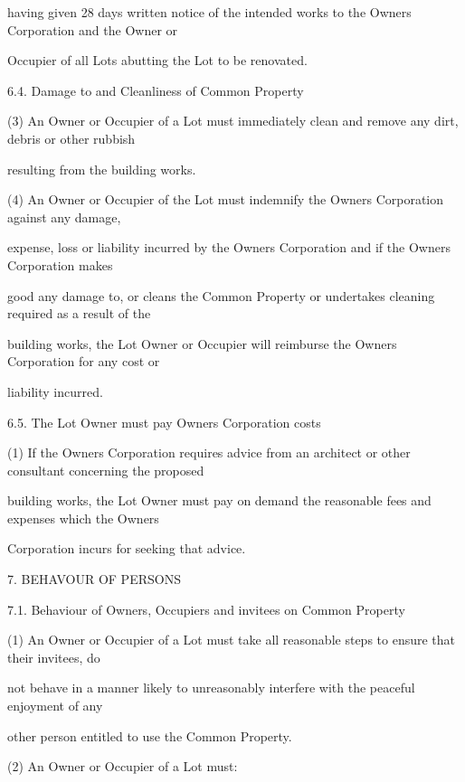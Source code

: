\documentclass{article}
\begin{document}
{\fontsize{10.02}{1}having given 28 days written notice of the intended works to the Owners Corporation and the Owner or }

{\fontsize{10.02}{1}Occupier of all Lots abutting the Lot to be renovated. }

{\fontsize{9.99}{1}6.4. Damage to and Cleanliness of Common Property }

{\fontsize{9.962}{1}(3) An Owner or Occupier of a Lot must immediately clean and remove any dirt, debris or other rubbish }

{\fontsize{10.02}{1}resulting from the building works. }

{\fontsize{9.962}{1}(4) An Owner or Occupier of the Lot must indemnify the Owners Corporation against any damage, }

{\fontsize{10.02}{1}expense, loss or liability incurred by the Owners Corporation and if the Owners Corporation makes }

{\fontsize{10.02}{1}good any damage to, or cleans the Common Property or undertakes cleaning required as a result of the }

{\fontsize{10.02}{1}building works, the Lot Owner or Occupier will reimburse the Owners Corporation for any cost or }

{\fontsize{10.02}{1}liability incurred. }

{\fontsize{9.99}{1}6.5. The Lot Owner must pay Owners Corporation costs }

{\fontsize{9.962}{1}(1) If the Owners Corporation requires advice from an architect or other consultant concerning the proposed }

{\fontsize{10.02}{1}building works, the Lot Owner must pay on demand the reasonable fees and expenses which the Owners }

{\fontsize{10.02}{1}Corporation incurs for seeking that advice. }

{\fontsize{9.99}{1}7. BEHAVOUR OF PERSONS }

{\fontsize{9.99}{1}7.1. Behaviour of Owners, Occupiers and invitees on Common Property }

{\fontsize{9.962}{1}(1) An Owner or Occupier of a Lot must take all reasonable steps to ensure that their invitees, do }

{\fontsize{10.02}{1}not behave in a manner likely to unreasonably interfere with the peaceful enjoyment of any }

{\fontsize{10.02}{1}other person entitled to use the Common Property. }

{\fontsize{9.962}{1}(2) An Owner or Occupier of a Lot must: }
\end{document}
